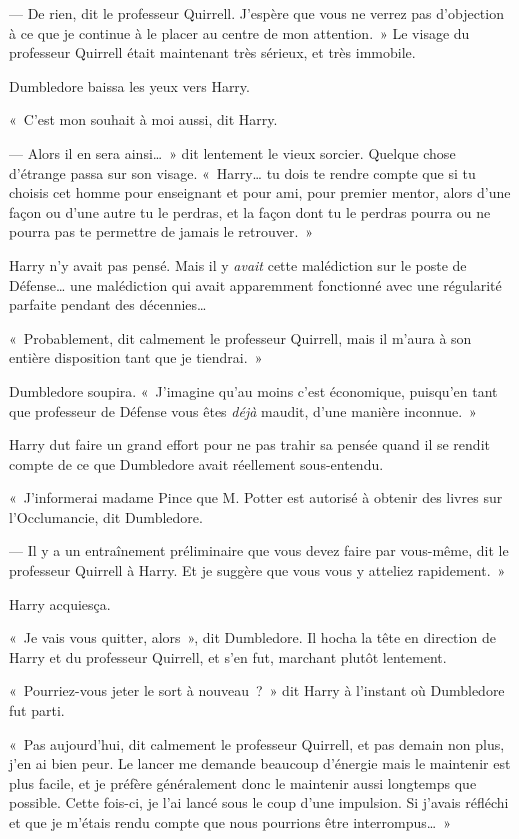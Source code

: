 --- De rien, dit le professeur Quirrell. J'espère que vous ne verrez pas d'objection à ce que je continue à le placer au centre de mon attention.~» Le visage du professeur Quirrell était maintenant très sérieux, et très immobile.

Dumbledore baissa les yeux vers Harry.

«~C'est mon souhait à moi aussi, dit Harry.

--- Alors il en sera ainsi…~» dit lentement le vieux sorcier. Quelque chose d'étrange passa sur son visage. «~Harry… tu dois te rendre compte que si tu choisis cet homme pour enseignant et pour ami, pour premier mentor, alors d'une façon ou d'une autre tu le perdras, et la façon dont tu le perdras pourra ou ne pourra pas te permettre de jamais le retrouver.~»

Harry n'y avait pas pensé. Mais il y \emph{avait} cette malédiction sur le poste de Défense… une malédiction qui avait apparemment fonctionné avec une régularité parfaite pendant des décennies…

«~Probablement, dit calmement le professeur Quirrell, mais il m'aura à son entière disposition tant que je tiendrai.~»

Dumbledore soupira. «~J'imagine qu'au moins c'est économique, puisqu'en tant que professeur de Défense vous êtes \emph{déjà} maudit, d'une manière inconnue.~»

Harry dut faire un grand effort pour ne pas trahir sa pensée quand il se rendit compte de ce que Dumbledore avait réellement sous-entendu.

«~J'informerai madame Pince que M. Potter est autorisé à obtenir des livres sur l'Occlumancie, dit Dumbledore.

--- Il y a un entraînement préliminaire que vous devez faire par vous-même, dit le professeur Quirrell à Harry. Et je suggère que vous vous y atteliez rapidement.~»

Harry acquiesça.

«~Je vais vous quitter, alors~», dit Dumbledore. Il hocha la tête en direction de Harry et du professeur Quirrell, et s'en fut, marchant plutôt lentement.

«~Pourriez-vous jeter le sort à nouveau~?~» dit Harry à l'instant où Dumbledore fut parti.

«~Pas aujourd'hui, dit calmement le professeur Quirrell, et pas demain non plus, j'en ai bien peur. Le lancer me demande beaucoup d'énergie mais le maintenir est plus facile, et je préfère généralement donc le maintenir aussi longtemps que possible. Cette fois-ci, je l'ai lancé sous le coup d'une impulsion. Si j'avais réfléchi et que je m'étais rendu compte que nous pourrions être interrompus…~»

